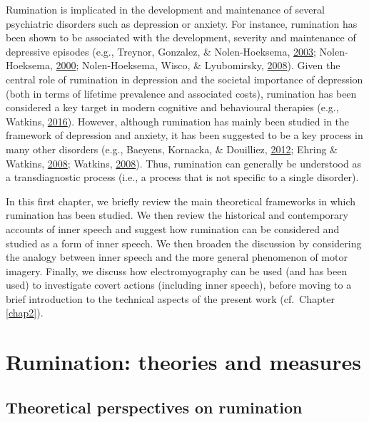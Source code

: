 \documentclass[a4paper,12pt,twoside,onecolumn,openright,final,oldfontcommands]{memoir}
\begin{document}
Rumination is implicated in the development and maintenance of several psychiatric disorders such as depression or anxiety. For instance, rumination has been shown to be associated with the development, severity and maintenance of depressive episodes (e.g., Treynor, Gonzalez, \& Nolen-Hoeksema, \protect\hyperlink{ref-treynor_rumination_2003}{2003}; Nolen-Hoeksema, \protect\hyperlink{ref-Nolen-Hoeksema2000}{2000}; Nolen-Hoeksema, Wisco, \& Lyubomirsky, \protect\hyperlink{ref-Nolen-Hoeksema2008}{2008}). Given the central role of rumination in depression and the societal importance of depression (both in terms of lifetime prevalence and associated costs), rumination has been considered a key target in modern cognitive and behavioural therapies (e.g., Watkins, \protect\hyperlink{ref-watkins_rumination-focused_2016}{2016}). However, although rumination has mainly been studied in the framework of depression and anxiety, it has been suggested to be a key process in many other disorders (e.g., Baeyens, Kornacka, \& Douilliez, \protect\hyperlink{ref-Baeyens2012}{2012}; Ehring \& Watkins, \protect\hyperlink{ref-ehring_repetitive_2008}{2008}; Watkins, \protect\hyperlink{ref-Watkins2008}{2008}). Thus, rumination can generally be understood as a transdiagnostic process (i.e., a process that is not specific to a single disorder).

In this first chapter, we briefly review the main theoretical frameworks in which rumination has been studied. We then review the historical and contemporary accounts of inner speech and suggest how rumination can be considered and studied as a form of inner speech. We then broaden the discussion by considering the analogy between inner speech and the more general phenomenon of motor imagery. Finally, we discuss how electromyography can be used (and has been used) to investigate covert actions (including inner speech), before moving to a brief introduction to the technical aspects of the present work (cf.~Chapter \ref{chap2}).

\hypertarget{rumination-theories-and-measures}{%
\section{Rumination: theories and measures}\label{rumination-theories-and-measures}}

\hypertarget{theoretical-perspectives-on-rumination}{%
\subsection{Theoretical perspectives on rumination}\label{theoretical-perspectives-on-rumination}}
\end{document}
